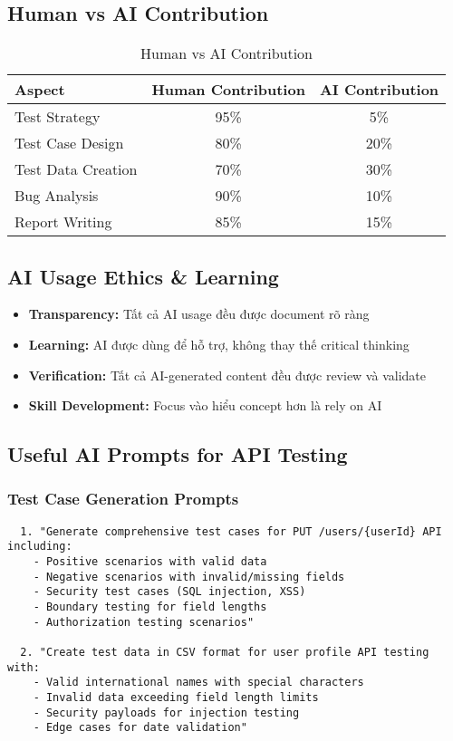 \documentclass[12pt,a4paper]{article}
\begin{document}
  \subsection{Human vs AI Contribution}

  \begin{table}[h!]
  \centering
  \begin{tabular}{|l|c|c|}
  \hline
  \textbf{Aspect} & \textbf{Human Contribution} & \textbf{AI Contribution} \\
  \hline
  Test Strategy & 95\% & 5\% \\
  \hline
  Test Case Design & 80\% & 20\% \\
  \hline
  Test Data Creation & 70\% & 30\% \\
  \hline
  Bug Analysis & 90\% & 10\% \\
  \hline
  Report Writing & 85\% & 15\% \\
  \hline
  \end{tabular}
  \caption{Human vs AI Contribution}
  \end{table}

  \subsection{AI Usage Ethics \& Learning}

  \begin{itemize}
  \item \textbf{Transparency:} Tất cả AI usage đều được document rõ ràng
  \item \textbf{Learning:} AI được dùng để hỗ trợ, không thay thế critical thinking
  \item \textbf{Verification:} Tất cả AI-generated content đều được review và validate
  \item \textbf{Skill Development:} Focus vào hiểu concept hơn là rely on AI
  \end{itemize}

  \subsection{Useful AI Prompts for API Testing}

  \subsubsection{Test Case Generation Prompts}
  \begin{lstlisting}
  1. "Generate comprehensive test cases for PUT /users/{userId} API including:
    - Positive scenarios with valid data
    - Negative scenarios with invalid/missing fields
    - Security test cases (SQL injection, XSS)
    - Boundary testing for field lengths
    - Authorization testing scenarios"

  2. "Create test data in CSV format for user profile API testing with:
    - Valid international names with special characters
    - Invalid data exceeding field length limits
    - Security payloads for injection testing
    - Edge cases for date validation"
  \end{lstlisting}
\end{document}
